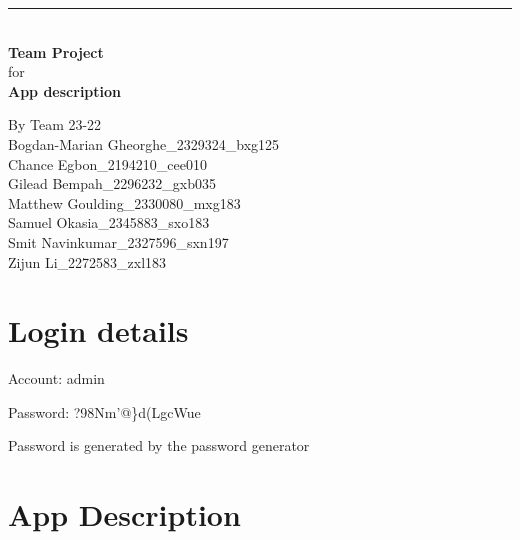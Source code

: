 \documentclass[a4paper]{article}
\begin{document}

\begin{titlepage}
	
	\rule{\linewidth}{5pt}
	\raggedleft
	\fontsize{38pt}{50pt}\selectfont
    \textbf{\\Team Project\\}
    \fontsize{28pt}{60pt}\selectfont 
    for\\
    \fontsize{38pt}{60pt}\selectfont 
    \textbf{App description\\}
	
	\vfill %
	
	
	\parbox[t]{0.93\textwidth}{ %
		\raggedleft %
		\large %
		{\Large By Team 23-22}\\[4pt] %
		Bogdan-Marian Gheorghe\_2329324\_bxg125\\
		Chance Egbon\_2194210\_cee010\\
		Gilead Bempah\_2296232\_gxb035\\
		Matthew Goulding\_2330080\_mxg183\\
		Samuel Okasia\_2345883\_sxo183\\
		Smit Navinkumar\_2327596\_sxn197\\
		Zijun Li\_2272583\_zxl183\\
	}
	
\end{titlepage}

\section*{Login details}

Account: admin 

Password: ?98Nm'@\}d(LgcWue

{\small Password is generated by the password generator}

\section*{App Description}
\end{document}
